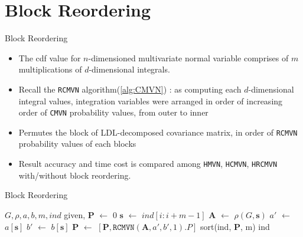 \section{Block Reordering}

\begin{frame}{Block Reordering}
\footnotesize
\begin{itemize}
	\item The cdf value for $n$-dimensioned multivariate normal variable comprises of $m$ multiplications of $d$-dimensional integrals.
	\item Recall the \texttt{RCMVN} algorithm(\ref{alg:CMVN}) : as computing each $d$-dimensional integral values, integration variables were arranged in order of increasing order of \texttt{CMVN} probability values, from outer to inner
	\item Permutes the block of LDL-decomposed covariance matrix, in order of \texttt{RCMVN} probability values of each blocks
	\item Result accuracy and time cost is compared among \texttt{HMVN}, \texttt{HCMVN}, \texttt{HRCMVN} with/without block reordering.
\end{itemize}
\end{frame}

\begin{frame}{Block Reordering}
\begin{algorithm}[H]
\caption{Blockwise reordering}
\begin{algorithmic}
	\tiny
	\State $G, \rho, a, b, m, ind$ given, $\mathbf{P}$ $\leftarrow$ $0$
	\State $\mathbf{s}$ $\leftarrow$ $ind[i:i+m-1]$
	\State $\mathbf{A}$ $\leftarrow$ $\rho(G, \mathbf{s})$
	\State $a'$ $\leftarrow$ $a[\mathbf{s}]$
	\State $b'$ $\leftarrow$ $b[\mathbf{s}]$
	\State $\mathbf{P}$ $\leftarrow$ $[\mathbf{P}, \texttt{RCMVN}(\mathbf{A},a',b',1).P]$
	\EndFor
	\State sort(ind, $\mathbf{P}$, m)
	\State \Return ind
	\EndProcedure
\end{algorithmic}\label{alg:BR}	
\end{algorithm}
\end{frame}

